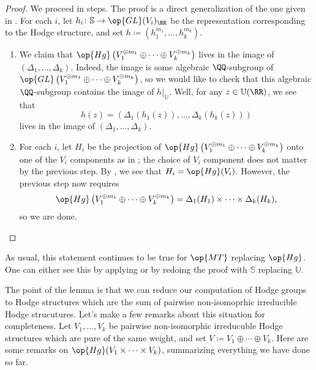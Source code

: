 \documentclass[../thesis.tex]{subfiles}
\begin{document}
\begin{proof}
	We proceed in steps. The proof is a direct generalization of the one given in . For each $i$, let $h_i\colon\mathbb S\to\op{GL}(V_i)_\RR$ be the representation corresponding to the Hodge structure, and set $h\coloneqq\left(h_1^{m_1},\ldots,h_k^{m_k}\right)$.
	\begin{enumerate}
		\item We claim that $\op{Hg}\left(V_1^{\oplus m_1}\oplus\cdots\oplus V_k^{\oplus m_k}\right)$ lives in the image of $(\Delta_1,\ldots,\Delta_k)$. Indeed, the image is some algebraic $\QQ$-subgroup of $\op{GL}\left(V_1^{\oplus m_1}\oplus\cdots\oplus V_k^{\oplus m_k}\right)$, so we would like to check that this algebraic $\QQ$-subgroup contains the image of $h|_{\mathbb U}$. Well, for any $z\in\mathbb U(\RR)$, we see that
		\[h(z)=(\Delta_1(h_1(z)),\ldots,\Delta_k(h_k(z)))\]
		lives in the image of $(\Delta_1,\ldots,\Delta_k)$.
		\item For each $i$, let $H_i$ be the projection of $\op{Hg}\left(V_1^{\oplus m_1}\oplus\cdots\oplus V_k^{\oplus m_k}\right)$ onto one of the $V_i$ components as in ; the choice of $V_i$ component does not matter by the previous step. By , we see that $H_i=\op{Hg}(V_i)$. However, the previous step now requires
		\[\op{Hg}\left(V_1^{\oplus m_1}\oplus\cdots\oplus V_k^{\oplus m_k}\right)=\Delta_1(H_1)\times\cdots\times \Delta_k(H_k),\]
		so we are done.
		\qedhere
	\end{enumerate}
\end{proof}
\begin{remark}
	As usual, this statement continues to be true for $\op{MT}$ replacing $\op{Hg}$. One can either see this by applying  or by redoing the proof with $\mathbb S$ replacing $\mathbb U$.
\end{remark}
The point of the lemma is that we can reduce our computation of Hodge groups to Hodge structures which are the sum of pairwise non-isomoprhic irreducible Hodge strucutures. Let's make a few remarks about this situation for completeness. Let $V_1,\ldots,V_k$ be pairwise non-isomorphic irreducuble Hodge structures which are pure of the same weight, and set $V\coloneqq V_1\oplus\cdots\oplus V_k$. Here are some remarks on $\op{Hg}(V_1\times\cdots\times V_k)$, summarizing everything we have done so far.
\end{document}
